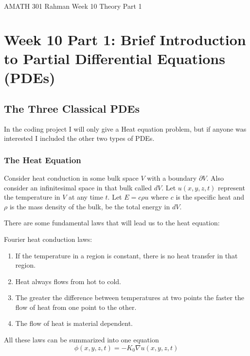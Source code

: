 \documentclass[reqno]{amsart}
\theoremstyle{definition}
\begin{document}
\begin{flushleft}
{\sc \Large AMATH 301 Rahman} \hfill Week 10 Theory Part 1
\bigskip
\end{flushleft}

\newcommand{\R}{\mathbb{R}}
\newcommand{\N}{\mathbb{N}}
\newcommand{\Z}{\mathbb{Z}}
\newcommand{\Q}{\mathbb{Q}}
\renewcommand{\CancelColor}{\color{red}}
\newcommand{\?}{\stackrel{?}{=}}
\renewcommand{\varphi}{\phi}
\newcommand{\card}{\text{Card}}
\newcommand{\bigzero}{\text{\Huge 0}}
\newcommand{\curvearrowdown}{{\color{red}\rotatebox{90}{$\curvearrowleft$}}}
\newcommand{\curvearrowup}{{\color{red}\rotatebox{90}{$\curvearrowright$}}}
\renewcommand{\L}{\mathcal{L}}
\newcommand{\xvect}{\overrightarrow{x}}
\newcommand{\vect}{\overrightarrow{v}}
\newcommand{\wvect}{\overrightarrow{w}}
\newcommand{\nuvect}{\overrightarrow{\nu}}
\newcommand{\omegavect}{\overrightarrow{\omega}}
\newcommand{\del}{\nabla}


\section*{Week 10 Part 1:  Brief Introduction to Partial Differential Equations (PDEs)}

\subsection*{The Three Classical PDEs}

In the coding project I will only give a Heat equation problem, but if anyone was interested I included the other two types of PDEs.

\subsubsection*{The Heat Equation}

Consider heat conduction in some bulk space $V$ with a boundary $\partial V$.
Also consider an infinitesimal space in that bulk called $dV$.  Let $u(x,y,z,t)$
represent the temperature in $V$ at any time $t$.  Let $E = c\rho u$
where $c$ is the specific heat and $\rho$ is the mass density of the bulk,
be the total energy in $dV$.

There are some fundamental laws that will lead us to the heat equation:
%
\begin{framed}
Fourier heat conduction laws:
\begin{enumerate}
\item  If the temperature in a region is constant, there is no heat transfer in that region.
\item  Heat always flows from hot to cold.
\item  The greater the difference between temperatures at two points the faster the flow of heat
from one point to the other.
\item  The flow of heat is material dependent.
\end{enumerate}
\end{framed}
%
All these laws can be summarized into one equation
%
\begin{equation}
\phi(x,y,z,t) = -K_0 \del u(x,y,z,t)
\end{equation}
%
\end{document}
